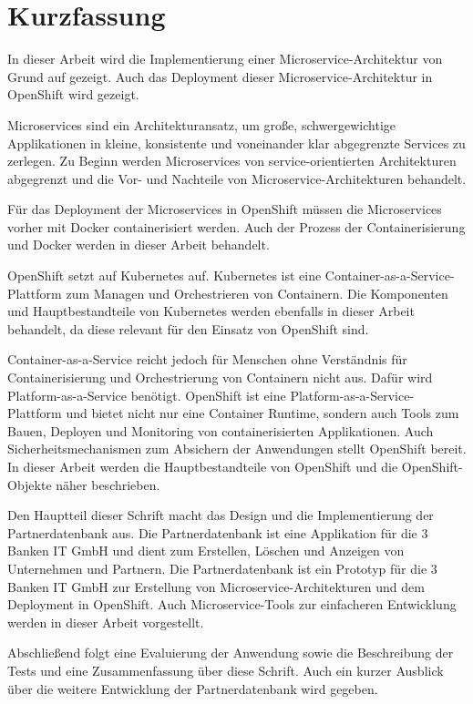 \chapter{Kurzfassung}
In dieser Arbeit wird die Implementierung einer Microservice-Architektur von Grund auf gezeigt. Auch das Deployment dieser Microservice-Architektur in OpenShift wird gezeigt. 

Microservices sind ein Architekturansatz, um große, schwergewichtige Applikationen in kleine, konsistente und voneinander klar abgegrenzte Services zu zerlegen.
Zu Beginn werden Microservices von service-orientierten Architekturen abgegrenzt und die Vor- und Nachteile von Microservice-Architekturen behandelt.

Für das Deployment der Microservices in OpenShift müssen die Microservices vorher mit Docker containerisiert werden. Auch der Prozess der Containerisierung und Docker werden in dieser Arbeit behandelt. 

OpenShift setzt auf Kubernetes auf. Kubernetes ist eine Container-as-a-Service-Plattform zum Managen und Orchestrieren von Containern. Die Komponenten und Hauptbestandteile von Kubernetes werden ebenfalls in dieser Arbeit behandelt, da diese relevant für den Einsatz von OpenShift sind.

Container-as-a-Service reicht jedoch für Menschen ohne Verständnis für Containerisierung und Orchestrierung von Containern nicht aus. Dafür wird Platform-as-a-Service benötigt. OpenShift ist eine Platform-as-a-Service-Plattform und bietet nicht nur eine Container Runtime, sondern auch Tools zum Bauen, Deployen und Monitoring von containerisierten Applikationen. Auch Sicherheitsmechanismen zum Absichern der Anwendungen stellt OpenShift bereit.
In dieser Arbeit werden die Hauptbestandteile von OpenShift und die OpenShift-Objekte näher beschrieben.

Den Hauptteil dieser Schrift macht das Design und die Implementierung der Partnerdatenbank aus. Die Partnerdatenbank ist eine Applikation für die 3 Banken IT GmbH und dient zum Erstellen, Löschen und Anzeigen von Unternehmen und Partnern. Die Partnerdatenbank ist ein Prototyp für die 3 Banken IT GmbH zur Erstellung von Microservice-Architekturen und dem Deployment in OpenShift. Auch Microservice-Tools zur einfacheren Entwicklung werden in dieser Arbeit vorgestellt.

Abschließend folgt eine Evaluierung der Anwendung sowie die Beschreibung der Tests und eine Zusammenfassung über diese Schrift. Auch ein kurzer Ausblick über die weitere Entwicklung der Partnerdatenbank wird gegeben.